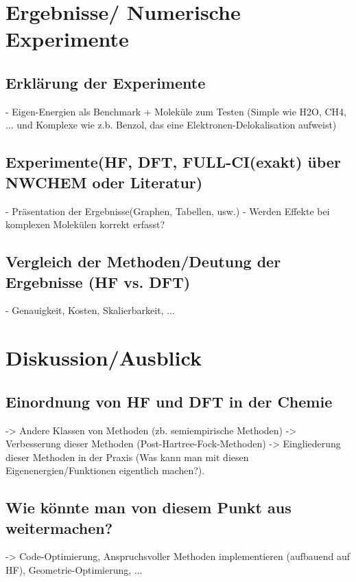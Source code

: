 \documentclass[a4paper, 12pt]{report}
\begin{document}
\chapter{Ergebnisse/ Numerische Experimente}
\section{Erklärung der Experimente}
- Eigen-Energien als Benchmark + Moleküle zum Testen (Simple wie
H2O, CH4, ... und Komplexe wie z.b. Benzol, das eine
Elektronen-Delokalisation aufweist)

\section{Experimente(HF, DFT, FULL-CI(exakt) über NWCHEM oder Literatur)}
- Präsentation der Ergebnisse(Graphen, Tabellen, usw.)
- Werden Effekte bei komplexen Molekülen korrekt erfasst?

\section{Vergleich der Methoden/Deutung der Ergebnisse (HF vs. DFT)}
- Genauigkeit, Kosten, Skalierbarkeit, ...

\chapter{Diskussion/Ausblick}
\section{Einordnung von HF und DFT in der Chemie}
-> Andere Klassen von Methoden (zb. semiempirische Methoden)
-> Verbesserung dieser Methoden (Post-Hartree-Fock-Methoden)
-> Eingliederung dieser Methoden in der Praxis (Was kann man mit
diesen Eigenenergien/Funktionen eigentlich machen?).

\section{Wie könnte man von diesem Punkt aus weitermachen?}
-> Code-Optimierung, Anspruchsvoller Methoden implementieren
(aufbauend auf HF), Geometrie-Optimierung, ...



\end{document}
